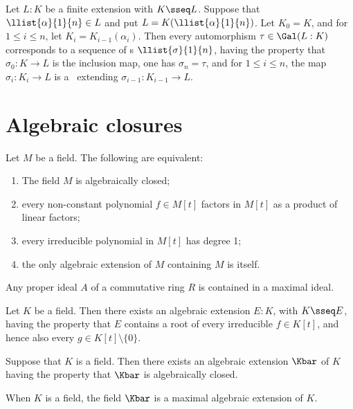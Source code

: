 \documentclass{article}
\begin{document}
  \begin{tcorollary}
    Let $L:K$ be a finite extension with $K\sseq L$. Suppose that $\llist{\alpha}{1}{n}\in L$ and put $L=K(\llist{\alpha}{1}{n})$. Let $K_0=K$, and for $1\leq i\leq n$, let $K_i=K_{i-1}(\alpha_i)$. Then every automorphism $\tau\in\Gal(L:K)$ corresponds to a sequence of \homo s $\llist{\sigma}{1}{n}$, having the property that $\sigma_0:K\to L$ is the inclusion map, one has $\sigma_n=\tau$, and for $1\leq i\leq n$, the map $\sigma_i:K_i\to L$ is a \homo~extending $\sigma_{i-1}:K_{i-1}\to L$.
  \end{tcorollary}

\section{Algebraic closures}
  \begin{lemma}
    Let $M$ be a field. The following are equivalent:
    \begin{enumerate}[label=(\roman*)]
      \item The field $M$ is algebraically closed;
      \item every non-constant polynomial $f\in M[t]$ factors in $M[t]$ as a product of linear factors;
      \item every irreducible polynomial in $M[t]$ has degree 1;
      \item the only algebraic extension of $M$ containing $M$ is itself.
    \end{enumerate}
  \end{lemma}

  \begin{tproposition}
    Any proper ideal $A$ of a commutative ring $R$ is contained in a maximal ideal.
  \end{tproposition}

  \begin{lemma}
    Let $K$ be a field. Then there exists an algebraic extension $E:K$, with $K\sseq E$, having the property that $E$ contains a root of every irreducible $f\in K[t]$, and hence also every $g\in K[t]\setminus\{ 0 \}$.
  \end{lemma}

  \begin{ttheorem}
    Suppose that $K$ is a field. Then there exists an algebraic extension $\Kbar$ of $K$ having the property that $\Kbar$ is algebraically closed.
  \end{ttheorem}

  \begin{tcorollary}
    When $K$ is a field, the field $\Kbar$ is a maximal algebraic extension of $K$.
  \end{tcorollary}
\end{document}
